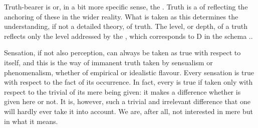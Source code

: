 %
Truth-bearer is  or, in a bit more specific sense, the .  Truth is a  of  reflecting the anchoring
of these in the wider reality. What is taken as this 
determines the understanding, if not a detailed theory, of truth.  The level, or
depth, of a truth reflects only the level addressed by the , which
corresponds to D in the schema ..


\label{pa:levelAtruth}\label{pa:immedSubject}
Sensation, if not also perception, can always be taken as true with respect to
itself, and this is the way of immanent truth taken by sensualism or
phenomenalism, whether of empirical or idealistic flavour. Every sensation is
true with respect to the fact of its occurrence.  In fact, every  is
true if taken only with respect to the trivial  of its mere
being given: it makes a difference whether  is given here or not. It
is, however, such a trivial and irrelevant difference that one will hardly ever
take it into account. We are, after all, not interested in mere 
but in what it means.

